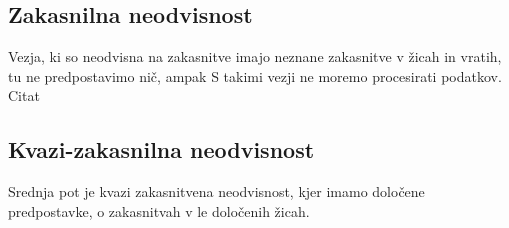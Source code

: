 \subsection{Zakasnilna neodvisnost} \label{b}

Vezja, ki so neodvisna na zakasnitve imajo neznane zakasnitve v žicah in vratih, tu ne predpostavimo nič, ampak S takimi vezji ne moremo procesirati podatkov. Citat

\subsection{Kvazi-zakasnilna neodvisnost} \label{b}
Srednja pot je kvazi zakasnitvena neodvisnost, kjer imamo določene predpostavke, o zakasnitvah v le določenih žicah.

